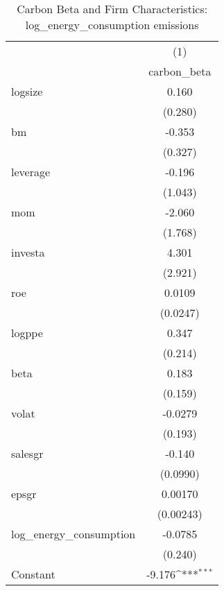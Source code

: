 \begin{table}[htbp]\centering
\def\sym#1{\ifmmode^{#1}\else\(^{#1}\)\fi}
\caption{Carbon Beta and Firm Characteristics: log\_energy\_consumption emissions}
\begin{tabular}{l*{1}{c}}
\hline\hline
                    &\multicolumn{1}{c}{(1)}\\
                    &\multicolumn{1}{c}{carbon\_beta}\\
\hline
logsize             &       0.160         \\
                    &     (0.280)         \\
[1em]
bm                  &      -0.353         \\
                    &     (0.327)         \\
[1em]
leverage            &      -0.196         \\
                    &     (1.043)         \\
[1em]
mom                 &      -2.060         \\
                    &     (1.768)         \\
[1em]
investa             &       4.301         \\
                    &     (2.921)         \\
[1em]
roe                 &      0.0109         \\
                    &    (0.0247)         \\
[1em]
logppe              &       0.347         \\
                    &     (0.214)         \\
[1em]
beta                &       0.183         \\
                    &     (0.159)         \\
[1em]
volat               &     -0.0279         \\
                    &     (0.193)         \\
[1em]
salesgr             &      -0.140         \\
                    &    (0.0990)         \\
[1em]
epsgr               &     0.00170         \\
                    &   (0.00243)         \\
[1em]
log\_energy\_consumption&     -0.0785         \\
                    &     (0.240)         \\
[1em]
Constant            &      -9.176\sym{***}\\

\end{tabular}
\end{table}
